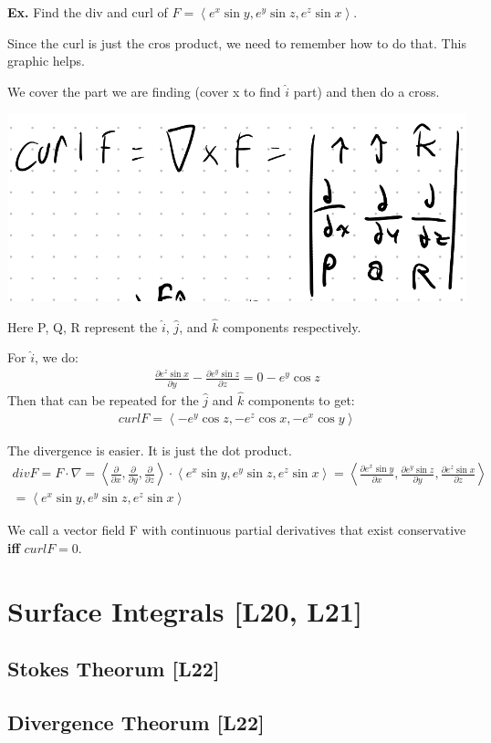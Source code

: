 \documentclass[12pt,letterpaper]{article} \usepackage{amsmath} \usepackage{graphicx} \usepackage[margin=1in]{geometry} \usepackage{longtable}  \usepackage{amssymb}
\begin{document}
	\begin{mdframed}[]
	\textbf{Ex. } Find the div and curl of $F=\left<e^x \sin y, e^y \sin z, e^z \sin x\right>$.
	
	Since the curl is just the cros product, we need to remember how to do that. This graphic helps. 
	
	We cover the part we are finding (cover x to find $\hat{i}$ part) and then do a cross. 
	\begin{center}
		\includegraphics[width=0.4\linewidth]{"cross product"}
	\end{center}
	Here P, Q, R represent the $\hat{i}$, $\hat{j}$, and $\hat{k}$ components respectively.
	
	For $\hat{i}$, we do:
	\begin{align*}
		\frac{\partial e^z \sin x}{\partial y} - \frac{\partial e^y \sin z}{\partial z} = 0 - e^y \cos z
	\end{align*}	
	Then that can be repeated for the $\hat{j}$ and $\hat{k}$ components to get:
	\begin{align*}
		curl F = \left<-e^y \cos z, -e^z \cos x, -e^x \cos y\right>
	\end{align*}

	The divergence is easier. It is just the dot product. 
	\begin{align*}
		div F = F \cdot \nabla = \left<\frac{\partial }{\partial x}, \frac{\partial }{\partial y}, \frac{\partial }{\partial z}\right> \cdot \left<e^x \sin y, e^y \sin z, e^z \sin x\right> = \left<\frac{\partial e^x \sin y}{\partial x}, \frac{\partial  e^y \sin z}{\partial y}, \frac{\partial  e^z \sin x}{\partial z}\right> \\
		=  \left<e^x \sin y, e^y \sin z, e^z \sin x\right>
	\end{align*}
	\end{mdframed}

	We call a vector field F with continuous partial derivatives that exist conservative \textbf{iff} $curl F = 0$.
	
	\section{Surface Integrals [L20, L21]}
	
	\subsection{Stokes Theorum [L22]}
	
	\subsection{Divergence Theorum [L22]}
	
\end{document}
